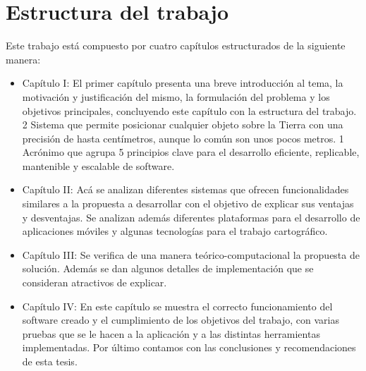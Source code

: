 \section{Estructura del trabajo}
Este trabajo está compuesto por cuatro capítulos estructurados de la siguiente
manera:
\begin{itemize}
      \item Capítulo I: El primer capítulo presenta una breve introducción al tema, la
            motivación y justificación del mismo, la formulación del problema y los objetivos
            principales, concluyendo este capítulo con la estructura del trabajo.
            2 Sistema que permite posicionar cualquier objeto sobre la Tierra con una precisión de hasta
            centímetros, aunque lo común son unos pocos metros.
            1 Acrónimo que agrupa 5 principios clave para el desarrollo eficiente, replicable, mantenible y
            escalable de software.
      \item Capítulo II: Acá se analizan diferentes sistemas que ofrecen funcionalidades
            similares a la propuesta a desarrollar con el objetivo de explicar sus ventajas y
            desventajas. Se analizan además diferentes plataformas para el desarrollo de
            aplicaciones móviles y algunas tecnologías para el trabajo cartográfico.
      \item Capítulo III: Se verifica de una manera teórico-computacional la propuesta de
            solución. Además se dan algunos detalles de implementación que se consideran
            atractivos de explicar.
      \item Capítulo IV: En este capítulo se muestra el correcto funcionamiento del software
            creado y el cumplimiento de los objetivos del trabajo, con varias pruebas que se le
            hacen a la aplicación y a las distintas herramientas implementadas. Por último
            contamos con las conclusiones y recomendaciones de esta tesis.
\end{itemize}

